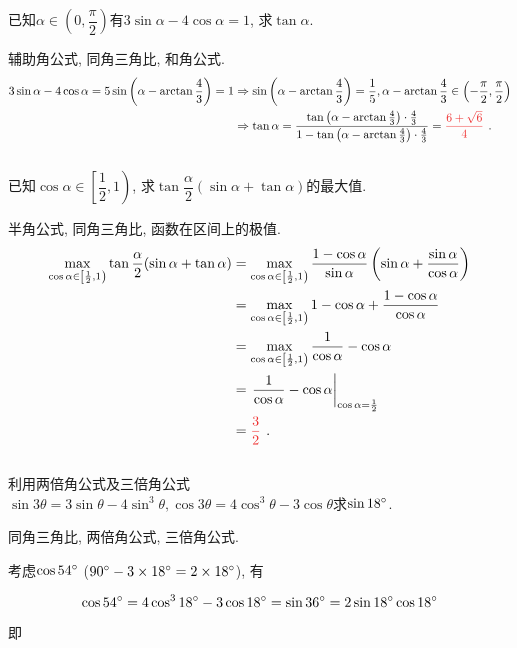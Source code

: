 \documentclass[8pt]{article}
\begin{document}
		已知$\alpha \in \left(0, \dfrac{\pi}{2}\right)$有$3\sin \alpha - 4\cos \alpha = 1$, 求$\tan \alpha$.

		辅助角公式, 同角三角比, 和角公式.
			\begin{align*}
				3\sin \alpha - 4\cos \alpha = 5\sin \left(\alpha - \arctan\frac{4}{3}\right)=1 &\Rightarrow \sin\left(\alpha - \arctan\frac{4}{3}\right)=\dfrac{1}{5}, \alpha-\arctan\dfrac{4}{3}\in\left(-\frac{\pi}{2}, \frac{\pi}{2}\right)\\
				&\Rightarrow \tan \alpha = \frac{\tan\left(\alpha - \arctan\frac{4}{3}\right) \cdot \frac{4}{3}}{1-\tan\left(\alpha - \arctan\frac{4}{3}\right)\cdot\frac{4}{3}}=\answer{$\frac{6+\sqrt{6}}{4}$}.
			\end{align*}
		~\\

		已知$\cos\alpha \in \left[\dfrac{1}{2}, 1\right)$, 求$\tan \dfrac{\alpha}{2}(\sin \alpha + \tan \alpha)$的最大值.

		半角公式, 同角三角比, 函数在区间上的极值.
			\begin{align*}
				\max_{\cos\alpha \in \left[\frac{1}{2}, 1\right)} \tan \dfrac{\alpha}{2}(\sin \alpha + \tan \alpha) &= \max_{\cos\alpha \in \left[\frac{1}{2}, 1\right)} \frac{1-\cos \alpha}{\sin \alpha} \left(\sin \alpha + \frac{\sin \alpha}{\cos \alpha}\right)\\
				&= \max_{\cos\alpha \in \left[\frac{1}{2}, 1\right)} 1-\cos\alpha + \frac{1-\cos\alpha}{\cos\alpha}\\
				&= \max_{\cos\alpha \in \left[\frac{1}{2}, 1\right)} \frac{1}{\cos \alpha} - \cos \alpha\\
				&= \at{\frac{1}{\cos \alpha}-\cos \alpha}{\cos \alpha = \frac{1}{2}}\\
				&= \answer{$\frac{3}{2}$}.
			\end{align*}
		~\\

		利用两倍角公式及三倍角公式$\sin 3\theta = 3\sin \theta - 4\sin^3 \theta, \cos 3\theta = 4\cos^3 \theta - 3\cos \theta$求$\sin 18^\circ$.

		同角三角比, 两倍角公式, 三倍角公式.

			考虑$\cos 54^\circ$ ($90^\circ - 3\times 18^\circ = 2\times 18^\circ$), 有

			$$\cos 54^\circ = 4\cos^3 18^\circ - 3\cos 18^\circ = \sin 36^\circ = 2\sin 18^\circ \cos 18^\circ$$

			即
\end{document}
